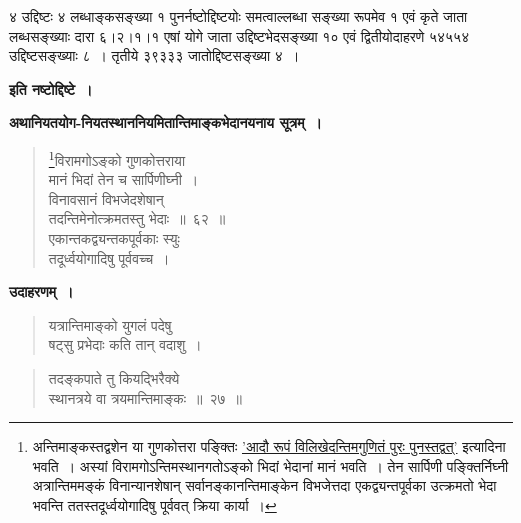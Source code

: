 \documentclass[11pt, openany]{book}
\begin{document}
\newpage

\noindent ४ उद्दिष्टः ४ लब्धाङ्कसङ्ख्या १ पुनर्नष्टोद्दिष्टयोः समत्वाल्लब्धा सङ्ख्या
रूपमेव १ एवं कृते जाता लब्धसङ्ख्याः दारा ६।२।१।१ एषां योगे जाता
उद्दिष्टभेदसङ्ख्या १० एवं द्वितीयोदाहरणे ५४५५४ उद्दिष्टसङ्ख्याः ८~।
तृतीये ३९३३३ जातोद्दिष्टसङ्ख्या ४~।

\begin{center}
\textbf{इति नष्टोद्दिष्टे~।}
\end{center}
\vspace{2mm}

\textbf{अथानियतयोग-नियतस्थाननियमितान्तिमाङ्कभेदानयनाय सूत्रम्~।}

\begin{quote}
	\renewcommand{\thefootnote}{१}\footnote{अन्तिमाङ्कस्तद्वशेन या गुणकोत्तरा पङ्क्तिः \hyperref[13.17]{'आदौ रूपं विलिखेदन्तिमगुणितं पुरः पुनस्तद्वत्'} इत्यादिना भवति~। अस्यां विरामगोऽन्तिमस्थानगतोऽङ्को भिदां भेदानां मानं भवति~। तेन सार्पिणी पङ्क्तिर्निघ्नी अत्रान्तिममङ्कं विनान्यानशेषान् सर्वानङ्कानन्तिमाङ्केन विभजेत्तदा एकद्व्यन्तपूर्वका उत्क्रमतो भेदा भवन्ति ततस्तदूर्ध्वयोगादिषु पूर्ववत् क्रिया कार्या~।}{\gk विरामगोऽङ्को गुणकोत्तराया\\
	मानं भिदां तेन च सार्पिणीघ्नी~।\\
	विनावसानं विभजेदशेषान्\\
	तदन्तिमेनोत्क्रमतस्तु भेदाः~॥~६२~॥\\
	एकान्तकद्व्यन्तकपूर्वकाः स्युः\\
	तदूर्ध्वयोगादिषु पूर्ववच्च~।}
\end{quote}

\textbf{उदाहरणम्~।}

\begin{quote}
{\ex यत्रान्तिमाङ्को युगलं पदेषु\\
षट्सु प्रभेदाः कति तान् वदाशु~।	}
\end{quote}

\newpage

\begin{quote}
{\ex तदङ्कपाते तु कियद्भिरैक्ये\\
स्थानत्रये वा त्रयमान्तिमाङ्कः~॥~२७~॥}	
\end{quote}
\end{document}
